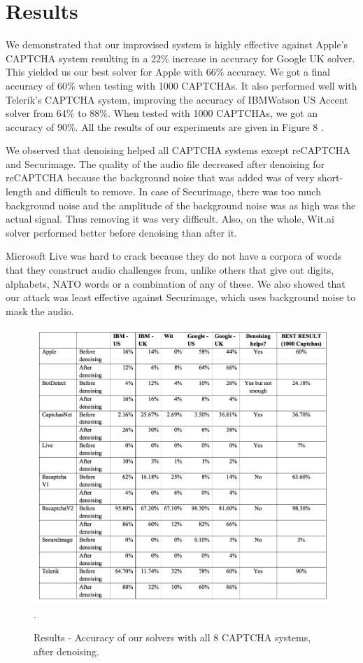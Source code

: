 \section{Results}
\label{sec:results}

We demonstrated that our improvised system is highly effective against Apple's CAPTCHA system resulting in a 22\% increase in accuracy for Google UK solver. This yielded us our best solver for Apple with 66\% accuracy. We got a final accuracy of 60\% when testing with 1000 CAPTCHAs. It also  performed well with Telerik's CAPTCHA system, improving the accuracy of IBMWatson US Accent solver from 64\% to 88\%. When tested with 1000 CAPTCHAs, we got an accuracy of 90\%. All the results of our experiments are given in Figure 8 .\newline

We observed that denoising helped all CAPTCHA systems except reCAPTCHA and Securimage. The quality of the audio file decreased after denoising for reCAPTCHA because the background noise that was added was of very short-length and difficult to remove. In case of Securimage, there was too much background noise and the amplitude of the background noise was as high was the actual signal. Thus removing it was very difficult. Also, on the whole, Wit.ai solver performed better before denoising than after it. \newline

Microsoft Live was hard to crack because they do not have a corpora of words that they construct audio challenges from, unlike others that give out digits, alphabets, NATO words or a combination of any of these. We also showed that our attack was least effective against Securimage, which uses background noise to mask the audio.\newline

\begin{figure}[t]
   \centering
   \includegraphics[width=\columnwidth]{figures/results4.jpg}.
   \caption{Results - Accuracy of our solvers with all 8 CAPTCHA systems, after denoising.}
   \label{fig:results2}
\end{figure}


